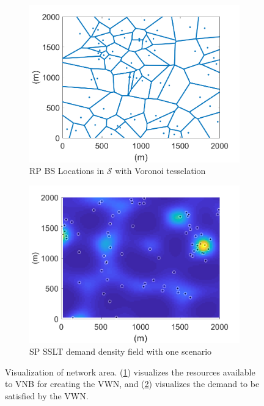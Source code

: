 \documentclass[conference]{IEEEtran}
\begin{document}
\begin{figure}[h]
\centering
\begin{subfigure}{.45\textwidth}
	\centering
	\includegraphics[width=1\linewidth]{Figures/BSLocationsVoronoi}
	\caption{RP BS Locations in $\mathcal{S}$ with Voronoi tesselation}
	\label{fig:BSLocVor}
\end{subfigure}
\hspace{0.5cm}
\begin{subfigure}{.45\textwidth}
	\centering
	\includegraphics[width=1\linewidth]{Figures/SSLTnsPPP_demandpointreal}
	\caption{SP SSLT demand density field with one scenario}
	\label{fig:SSLTDPReal}
\end{subfigure}
\caption{\small Visualization of network area.  (\ref{fig:BSLocVor}) visualizes the resources available to VNB for creating the VWN, and (\ref{fig:SSLTDPReal}) visualizes the demand to be satisfied by the VWN.}
\label{fig:NetworkArea}
\end{figure}
\end{document}
